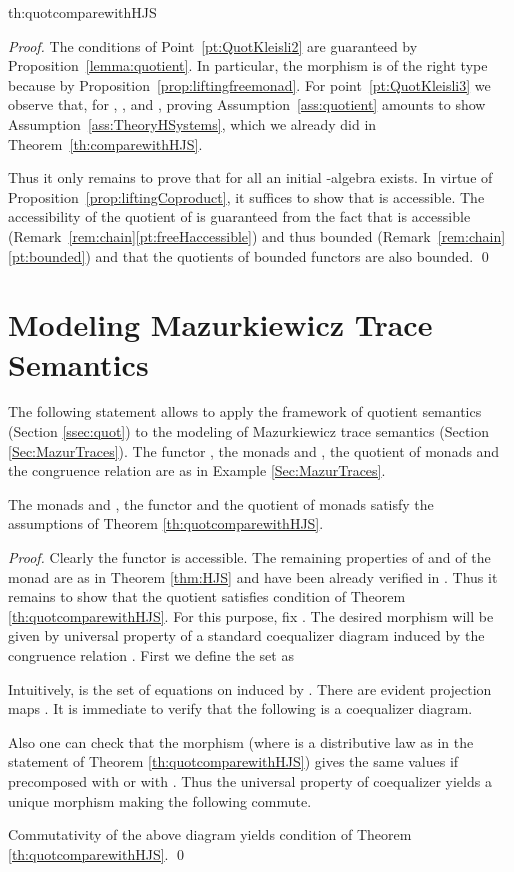 \documentclass[oribibl,envcountsame,envcountsect,runningheads]{llncs}
\renewcommand{\>}{\rangle}
\newenvironment{theorem_for}[2][\empty]{\bigskip\noindent{\bf
    Theorem~\ref{#2}}\ifthenelse{\equal{#1}{\empty}}{{\bf.}}{ {\bf (#1).}}\it}{\vspace{0.5cm}}
\begin{document}
\begin{theorem_for}{th:quotcomparewithHJS}
\thquotcomparewithHJS
\end{theorem_for}
\begin{proof} The conditions of Point~\ref{pt:QuotKleisli2} are guaranteed by Proposition~\ref{lemma:quotient}. In particular, the morphism  is of the right type because  by Proposition~\ref{prop:liftingfreemonad}. For point~\ref{pt:QuotKleisli3} we observe that, for , ,  and , proving Assumption~\ref{ass:quotient} amounts to show Assumption~\ref{ass:TheoryHSystems}, which we already did in Theorem~\ref{th:comparewithHJS}.

Thus it only remains to prove that for all  an initial -algebra exists. In virtue of Proposition~\ref{prop:liftingCoproduct}, it suffices to show that  is accessible. The accessibility of the quotient  of  is guaranteed from the fact that  is accessible (Remark~\ref{rem:chain}\ref{pt:freeHaccessible}) and thus bounded (Remark~\ref{rem:chain}\ref{pt:bounded}) and that the quotients of bounded functors are also bounded.
\qed
\end{proof}

\section{Modeling Mazurkiewicz Trace Semantics}\label{app:mazurAss}

 The following statement allows to apply the framework of quotient semantics (Section \ref{ssec:quot}) to the modeling of Mazurkiewicz trace semantics (Section \ref{Sec:MazurTraces}). The functor , the monads  and , the quotient of monads  and the congruence relation  are as in Example \ref{Sec:MazurTraces}.

\begin{proposition}The monads  and , the functor  and the quotient of monads   satisfy the assumptions of Theorem \ref{th:quotcomparewithHJS}.
\end{proposition}
\begin{proof}
Clearly the functor  is accessible. The remaining properties of  and of the monad  are as in Theorem \ref{thm:HJS} and have been already verified in \cite{HasuoJS:07}. Thus it remains to show that the quotient  satisfies condition  of Theorem \ref{th:quotcomparewithHJS}. For this purpose, fix . The desired morphism  will be given by universal property of a standard coequalizer diagram induced by the congruence relation . First we define the set  as

Intuitively,  is the set of equations on  induced by . There are evident projection maps . It is immediate to verify that the following is a coequalizer diagram.

Also one can check that the morphism  (where  is a distributive law as in the statement of Theorem \ref{th:quotcomparewithHJS}) gives the same values if precomposed with  or with . Thus the universal property of coequalizer yields a unique morphism  making the following commute.

Commutativity of the above diagram yields condition  of Theorem \ref{th:quotcomparewithHJS}. \qed
\end{proof} 

 
\end{document}
